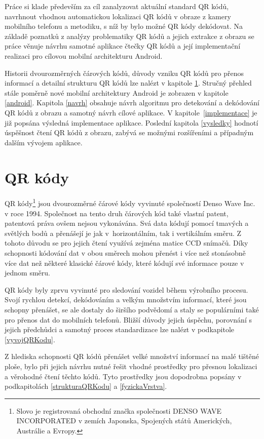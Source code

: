 Práce si klade především za cíl zanalyzovat aktuální standard QR kódů, 
navrhnout vhodnou automatickou lokalizaci QR kódů v obraze z kamery mobilního
telefonu a metodiku, s níž by bylo možné QR kódy dekódovat. Na základě poznatků
z analýzy problematiky QR kódů a jejich extrakce z obrazu se práce věnuje návrhu
samotné aplikace čtečky QR kódů a její implementační realizaci pro cílovou 
mobilní architekturu Android.

Historii dvourozměrných čárových kódů, důvody vzniku QR kódů pro přenos 
informací a detailní strukturu QR kódů lze nalézt v kapitole \ref{QRKody}.
Stručný přehled stále poměrně nové mobilní architektury Android je zobrazen v
kapitole \ref{android}. Kapitola \ref{navrh} obsahuje návrh
algoritmu pro detekování a dekódování QR kódů z obrazu a samotný návrh cílové
aplikace. V kapitole~\ref{implementace} je již popsána výsledná implementace
aplikace. Poslední kapitola \ref{vysledky} hodnotí úspěšnost čtení QR kódů z
obrazu, zabývá se možnými rozšířeními a případným dalším vývojem aplikace.

\chapter{QR kódy}
\label{QRKody}

QR kódy\footnote{Slovo  je registrovaná obchodní značka
společnosti DENSO WAVE INCORPORATED v zemích Japonska, Spojených států Amerických, Austrálie
a Evropy.} jsou dvourozměrné čárové kódy vyvinuté společností Denso Wave Inc. 
v roce 1994. Společnost na tento druh čárových kód také vlastní patent, 
patentová práva ovšem nejsou vykonávána. Svá data kódují pomocí tmavých a 
světlých bodů a přenášejí je jak v~horizontálním, tak i vertikálním směru. 
Z tohoto důvodu se pro jejich čtení využívá zejména matice CCD snímačů. Díky 
schopnosti kódování dat v obou směrech mohou přenést i více než stonásobně 
více dat než některé klasické čárové kódy, které kódují své informace pouze 
v jednom směru. \cite{aboutQRCOde} 

QR kódy byly zprvu vyvinuté pro sledování vozidel během výrobního procesu. 
Svojí rychlou detekcí, dekódováním a velkým množstvím informací, které jsou 
schopny přenášet, se ale dostaly do širšího podvědomí a 
staly se populárními také pro přenos dat do mobilních telefonů. Bližší důvody 
jejich úspěchu, porovnání s jejich předchůdci a samotný proces standardizace 
lze nalézt v podkapitole \ref{vyvojQRKodu}.

Z hlediska schopnosti QR kódů přenášet velké množství informací na malé tištěné 
ploše, bylo při jejich návrhu nutné řešit vhodné prostředky pro přesnou 
lokalizaci a věrohodné čtení těchto kódů. Tyto prostředky jsou dopodrobna 
popsány v podkapitolách \ref{strukturaQRKodu} a \ref{fyzickaVrstva}. 

